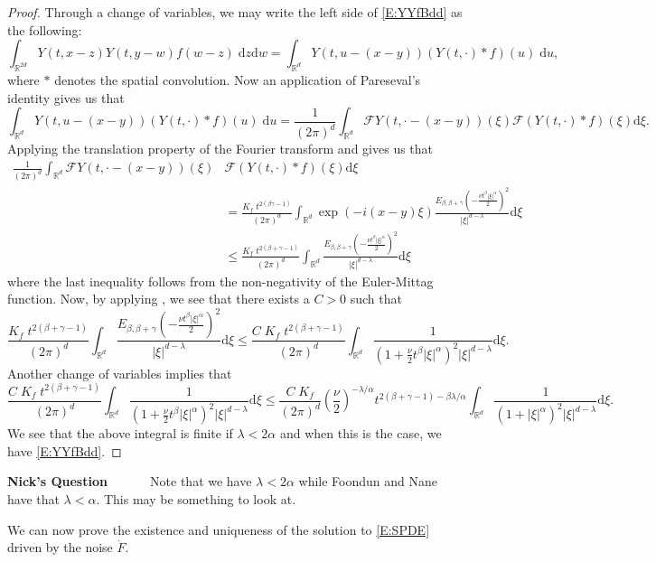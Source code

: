 \documentclass[a4paper,11pt]{article}
\numberwithin{equation}{section}
\theoremstyle{plain}
\theoremstyle{definition}
\newcommand{\ud}{\ensuremath{\mathrm{d} }}
\newcommand{\R}{\mathbb{R}}
\newcounter{NQ}
\newenvironment{NickQuestion}[1][] %
{\refstepcounter{NQ}
	\begin{mdframed}[backgroundcolor=lightgray]\textbf{Nick's Question \theNQ \: #1~~}~~~\noindent}%
	{\end{mdframed}}
\numberwithin{NQ}{section}
\numberwithin{LQ}{section}
\numberwithin{ZQ}{section}
\begin{document}
	\begin{proof}
		Through a change of variables, we may write the left side of \eqref{E:YYfBdd} as the following:
		\[
		\int_{\R^{2d}} Y(t,x-z)Y(t,y-w)f(w-z) \; \ud z \ud w = \int_{\R^{d}} Y\left(t,u-(x-y)\right)(Y(t,\cdot)*f)(u) \; \ud u,
		\]
		where $*$ denotes the spatial convolution. Now an application of Pareseval's identity gives us that 
		\[
		\int_{\R^{d}} Y\left(t,u-(x-y)\right)(Y(t,\cdot)*f)(u) \; \ud u = \frac{1}{(2\pi)^d} 	\int_{\R^{d}} \mathcal{F}Y\left(t,\cdot-(x-y)\right)(\xi) \mathcal{F}(Y(t,\cdot)*f)(\xi) \ud \xi.
		\]
		Applying the translation property of the Fourier transform and \cite[Theorem 4.1]{CHN19} gives us that 
		\begin{align*}
		\frac{1}{(2\pi)^d} 	\int_{\R^{d}} \mathcal{F}Y\left(t,\cdot-(x-y)\right)(\xi) & \mathcal{F}(Y(t,\cdot)*f)(\xi) \ud \xi \\
		& = \frac{ K_f \; t^{2(\beta  \gamma -1)} }{ (2\pi)^d } \int_{\R^{d}} \exp(-i(x-y)\xi) \frac{E_{\beta,\beta+\gamma}\left(-\frac{\nu t^\beta |\xi|^\alpha}{2}\right)^2}{|\xi|^{d-\lambda}} \ud \xi \\
		& \le \frac{K_f \; t^{2(\beta + \gamma -1)}  }{ (2\pi)^d } \int_{\R^{d}}  \frac{E_{\beta,\beta+\gamma}\left(-\frac{\nu t^\beta |\xi|^\alpha}{2}\right)^2}{|\xi|^{d-\lambda}} \ud \xi
		\end{align*}
		where the last inequality follows from the non-negativity of the Euler-Mittag function. Now, by applying \cite[Theorem 1.6]{Podlubny99}, we see that there exists a $C>0$ such that 
		\[
		\frac{K_f \; t^{2(\beta + \gamma -1)}  }{ (2\pi)^d } \int_{\R^{d}}  \frac{E_{\beta,\beta+\gamma}\left(-\frac{\nu t^\beta |\xi|^\alpha}{2}\right)^2}{|\xi|^{d-\lambda}} \ud \xi \le 
		\frac{C\; K_f \; t^{2(\beta + \gamma -1)}  }{ (2\pi)^d } \int_{\R^{d}}  \frac{ 1 }{\left(1+ \frac{\nu}{2} t^\beta |\xi|^\alpha \right)^2 |\xi|^{d-\lambda} } \ud \xi.
		\]
		Another change of variables implies that 
		\[
		\frac{C\; K_f \; t^{2(\beta + \gamma -1)}  }{ (2\pi)^d } \int_{\R^{d}}  \frac{ 1 }{\left(1+ \frac{\nu}{2} t^\beta |\xi|^\alpha\right)^2 |\xi|^{d-\lambda}} \ud \xi \le 
		\frac{C\; K_f }{ (2\pi)^d } \left(\frac{\nu}{2}\right)^{-\lambda/\alpha}  t^{2(\beta + \gamma -1)-\beta \lambda/\alpha} \int_{\R^{d}}  \frac{ 1 }{\left(1+ |\xi|^\alpha\right)^2 |\xi|^{d-\lambda}} \ud \xi.
		\]
		We see that the above integral is finite if $\lambda < 2\alpha$ and when this is the case, we have \eqref{E:YYfBdd}.
	\end{proof}
	\begin{NickQuestion}
		Note that we have $\lambda < 2 \alpha$ while Foondun and Nane \cite{FN2016} have that $\lambda < \alpha$. This may be something to look at. 
	\end{NickQuestion}
	We can now prove the existence and uniqueness of the solution to \eqref{E:SPDE} driven by the noise $\dot{F}$. 
	
\end{document}
